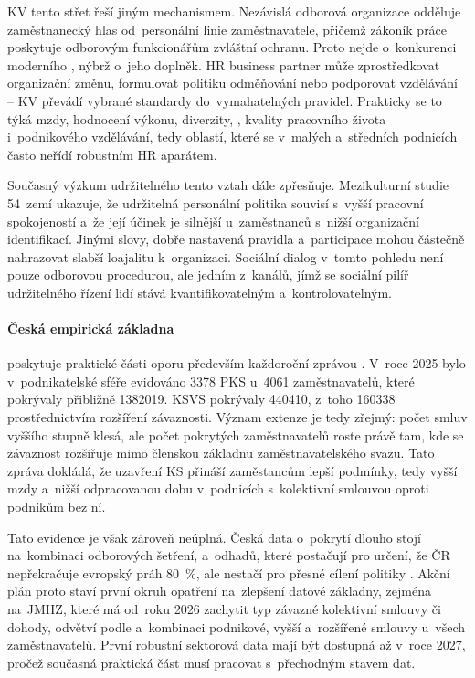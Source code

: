 \Ac{KV} tento střet řeší jiným mechanismem. Nezávislá odborová organizace odděluje zaměstnanecký hlas od~personální linie zaměstnavatele, přičemž zákoník práce poskytuje odborovým funkcionářům zvláštní ochranu. Proto nejde o~konkurenci moderního , nýbrž o~jeho doplněk. HR business partner může zprostředkovat organizační změnu, formulovat politiku odměňování nebo podporovat vzdělávání -- \ac{KV} převádí vybrané standardy do~vymahatelných pravidel. Prakticky se to týká mzdy, hodnocení výkonu, diverzity, , kvality pracovního života i~podnikového vzdělávání, tedy oblastí, které se v~malých a~středních podnicích často neřídí robustním HR aparátem.~\cite{Armstrong_HRM2006}\par

Současný výzkum udržitelného  tento vztah dále zpřesňuje. Mezikulturní studie 54~zemí ukazuje, že udržitelná personální politika souvisí s~vyšší pracovní spokojeností a~že její účinek je silnější u~zaměstnanců s~nižší organizační identifikací. Jinými slovy, dobře nastavená pravidla a~participace mohou částečně nahrazovat slabší loajalitu k~organizaci. Sociální dialog v~tomto pohledu není pouze odborovou procedurou, ale jedním z~kanálů, jímž se sociální pilíř udržitelného řízení lidí stává kvantifikovatelným a~kontrolovatelným.\cite{WojtczukTurek_SustainHRM_JobSatisfaction2024}\par

\paragraph{Česká empirická základna} poskytuje praktické části oporu především každoroční zprávou . V~roce 2025 bylo v~podnikatelské sféře evidováno \num{3378} \ac{PKS} u~\num{4061} zaměstnavatelů, které pokrývaly přibližně \SI{1382019}{\person}. \ac{KSVS} pokrývaly \SI{440410}{\person}, z~toho \SI{160338}{\person} prostřednictvím rozšíření závaznosti. Význam extenze je tedy zřejmý: počet smluv vyššího stupně klesá, ale počet pokrytých zaměstnavatelů roste právě tam, kde se závaznost rozšiřuje mimo členskou základnu zaměstnavatelského svazu. Tato zpráva dokládá, že uzavření \ac{KS} přináší zaměstancům lepší podmínky, tedy vyšší mzdy a~nižší odpracovanou dobu v~podnicích s~kolektivní smlouvou oproti podnikům bez ní.~\cite{CMKOS_ZpravaKV2025}\par

Tato evidence je však zároveň neúplná. Česká data o~pokrytí  dlouho stojí na~kombinaci odborových šetření,  a~odhadů, které postačují pro určení, že \ac{ČR} nepřekračuje evropský práh \SI{80}{\percent}, ale nestačí pro přesné cílení politiky . Akční plán  proto staví první okruh opatření na~zlepšení datové základny, zejména na~\ac{JMHZ}, které má od~roku 2026 zachytit typ závazné kolektivní smlouvy či dohody, odvětví podle  a~kombinaci podnikové, vyšší a~rozšířené smlouvy u~všech zaměstnavatelů. První robustní sektorová data mají být dostupná až v~roce 2027, pročež současná praktická část musí pracovat s~přechodným stavem dat.~\cite{MPSV_AkcniPlanKV2025}~\cite{MPSV_JMHZ_2026}\par

